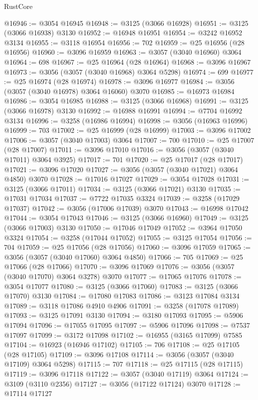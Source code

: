 \begin{lexlean}{RustCore}
\begin{coremodule}
@16946 := @3054 @16945
@16948 := @3125 (@3066 @16928)
@16951 := @3125 (@3066 @16938) @3130
@16952 := @16948 @16951
@16954 := @3242 @16952 @3134
@16955 := @3118 @16954
@16956 := 702
@16959 := @25 @16956 (@28 @16956)
@16960 := @3096 @16959
@16963 := @3057 (@3040 @16960) @3064
@16964 := 698
@16967 := @25 @16964 (@28 @16964)
@16968 := @3096 @16967
@16973 := @3056 (@3057 (@3040 @16968) @3064 @5298)
@16974 := 699
@16977 := @25 @16974 (@28 @16974)
@16978 := @3096 @16977
@16984 := @3056 (@3057 (@3040 @16978) @3064 @16060) @3070
@16985 := @16973 @16984
@16986 := @3054 @16985
@16988 := @3125 (@3066 @16968)
@16991 := @3125 (@3066 @16978) @3130
@16992 := @16988 @16991
@16994 := @7704 @16992 @3134
@16996 := @3258 (@16986 @16994)
@16998 := @3056 (@16963 @16996)
@16999 := 703
@17002 := @25 @16999 (@28 @16999)
@17003 := @3096 @17002
@17006 := @3057 (@3040 @17003) @3064
@17007 := 700
@17010 := @25 @17007 (@28 @17007)
@17011 := @3096 @17010
@17016 := @3056 (@3057 (@3040 @17011) @3064 @3925)
@17017 := 701
@17020 := @25 @17017 (@28 @17017)
@17021 := @3096 @17020
@17027 := @3056 (@3057 (@3040 @17021) @3064 @4850) @3070
@17028 := @17016 @17027
@17029 := @3054 @17028
@17031 := @3125 (@3066 @17011)
@17034 := @3125 (@3066 @17021) @3130
@17035 := @17031 @17034
@17037 := @7722 @17035 @3324
@17039 := @3258 (@17029 @17037)
@17042 := @3056 (@17006 @17039) @3070
@17043 := @16998 @17042
@17044 := @3054 @17043
@17046 := @3125 (@3066 @16960)
@17049 := @3125 (@3066 @17003) @3130
@17050 := @17046 @17049
@17052 := @3964 @17050 @3324
@17054 := @3258 (@17044 @17052)
@17055 := @3125 @17054
@17056 := 704
@17059 := @25 @17056 (@28 @17056)
@17060 := @3096 @17059
@17065 := @3056 (@3057 (@3040 @17060) @3064 @4850)
@17066 := 705
@17069 := @25 @17066 (@28 @17066)
@17070 := @3096 @17069
@17076 := @3056 (@3057 (@3040 @17070) @3064 @3278) @3070
@17077 := @17065 @17076
@17078 := @3054 @17077
@17080 := @3125 (@3066 @17060)
@17083 := @3125 (@3066 @17070) @3130
@17084 := @17080 @17083
@17086 := @3123 @17084 @3134
@17089 := @3118 @17086 @4910 @4906
@17091 := @3258 (@17078 @17089)
@17093 := @3125 @17091 @3130
@17094 := @3180 @17093
@17095 := @5906 @17094
@17096 := @17055 @17095
@17097 := @5906 @17096
@17098 := @7537 @17097
@17099 := @3172 @17098
@17102 := @16955 (@3165 @17099) @7585
@17104 := @16923 (@16946 @17102)
@17105 := 706
@17108 := @25 @17105 (@28 @17105)
@17109 := @3096 @17108
@17114 := @3056 (@3057 (@3040 @17109) @3064 @5298)
@17115 := 707
@17118 := @25 @17115 (@28 @17115)
@17119 := @3096 @17118
@17122 := @3057 (@3040 @17119) @3064
@17124 := @3109 (@3110 @2356)
@17127 := @3056 (@17122 @17124) @3070
@17128 := @17114 @17127

\end{coremodule}
\end{lexlean}
